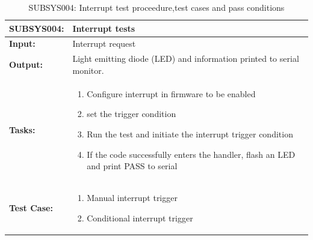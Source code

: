 \begin{table}[H]
    \centering
    \caption{SUBSYS004: Interrupt test proceedure,test cases and pass conditions}
    \begin{tabular}{|m{}|m{}|}
    \hline
       \textbf{SUBSYS004: }  &  Interrupt tests\\
       \hline
        \textbf{Input: } &  Interrupt request\\
        \hline
        \textbf{Output: } & Light emitting diode (LED) and information printed to serial monitor.\\
        \hline
        \textbf{Tasks: } & \begin{enumerate}
        \vspace{1mm}
            \item Configure interrupt in firmware to be enabled
            \item set the trigger condition
            \item Run the test and initiate the interrupt trigger condition
            \item If the code successfully enters the handler, flash an LED and print PASS to serial
        \end{enumerate}\\
        \hline
        \textbf{Test Case: } & \begin{enumerate}
            \vspace{1mm}
            \item Manual interrupt trigger
            \item Conditional interrupt trigger
            
        \end{enumerate}\\
        \hline
    \end{tabular}

    \label{tab:SUBSYS004}
\end{table}

